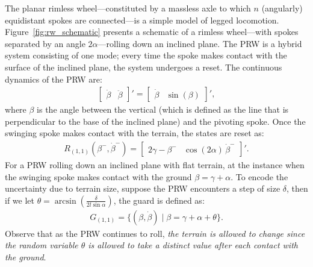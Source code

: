 \begin{example}
\label{example:rw}
The planar rimless wheel---constituted by a massless axle to which $n$ (angularly) equidistant spokes are connected---is a simple model of legged locomotion.
Figure~\ref{fig:rw_schematic} presents a schematic of a rimless wheel---with spokes separated by an angle $2\alpha$---rolling down an inclined plane.
The PRW is a hybrid system consisting of one mode; every time the spoke makes contact with the surface of the inclined plane, the system undergoes a reset.
The continuous dynamics of the PRW are:
\begin{align}
  \begin{bmatrix}
    \dot \beta& \ddot\beta
  \end{bmatrix}'=\begin{bmatrix}
    \dot\beta&\sin(\beta)
  \end{bmatrix}',
\end{align}
where $\beta$ is the angle between the vertical (which is defined as the line that is perpendicular to the base of the inclined plane) and the pivoting spoke. 
Once the swinging spoke makes contact with the terrain, the states are reset as:
\begin{align}
R_{(1,1)}(\beta^-,\dot \beta^-)=\begin{bmatrix}
    2\gamma-\beta^-&
    \cos(2\alpha)\,\dot\beta^-
  \end{bmatrix}'.
\end{align}
For a PRW rolling down an inclined plane with flat terrain, at the instance when the swinging spoke makes contact with the ground $\beta = \gamma + \alpha$.
To encode the uncertainty due to terrain size, suppose the PRW encounters a step of size $\delta$, then if we let $\theta =  \arcsin \left( \frac{\delta}{2 l \sin \alpha} \right)$, the guard is defined as:
\begin{align}
G_{(1,1)}=\{ (\beta, \dot{\beta})\mid \beta=\gamma+\alpha+\theta\}.
\end{align}
Observe that as the PRW continues to roll, \emph{the terrain is allowed to change since the random variable $\theta$ is allowed to take a distinct value after each contact with the ground}.
\end{example}

